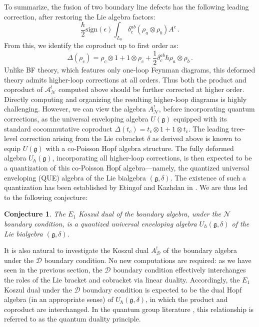 \documentclass[11pt]{article}
\numberwithin{equation}{section}
\newtheorem{conj}{Conjecture}[section]
\begin{document}
To summarize, the fusion of two boundary line defects has the following leading correction, after restoring the Lie algebra factors:
\begin{equation}
	\frac{\hbar}{2}\mathrm{sign}(\epsilon)\int_{L_0 }\delta^{ab}_c(\rho_a\otimes \rho_b)A^ c\,.
\end{equation}
From this, we identify the coproduct up to first order as:
\begin{equation}
	\Delta(\rho_c) = \rho_c\otimes 1 + 1\otimes \rho_c + \frac{1}{2}\delta^{ab}_c \hbar \rho_a\otimes \rho_b\,.
\end{equation}
Unlike BF theory, which features only one-loop Feynman diagrams, this deformed theory admits higher-loop corrections at all orders. Thus both the product and coproduct of $\mathcal{A}_{\mathcal{N}}^{!}$ computed above should be further corrected at higher order. Directly computing and organizing the resulting higher-loop diagrams is highly challenging. However, we can view the algebra $A^!_{\mathcal{N}}$, before incorporating quantum corrections, as the universal enveloping algebra $U(\mathfrak{g})$ equipped with its standard cocommutative coproduct $\Delta(t_c) = t_c \otimes 1 + 1 \otimes t_c$. The leading tree-level correction arising from the Lie cobracket $\delta$ as derived above is known to equip $U(\mathfrak{g})$ with a co-Poisson Hopf algebra structure. The fully deformed algebra $U_{\hbar}(\mathfrak{g})$, incorporating all higher-loop corrections, is then expected to be a quantization of this co-Poisson Hopf algebra—namely, the quantized universal enveloping (QUE) algebra of the Lie bialgebra $(\mathfrak{g},\delta)$. The existence of such a quantization has been established by Etingof and Kazhdan in \cite{EK1996QLBI,EK1998QLBII}. We are thus led to the following conjecture:
\begin{conj}
	The $E_1$ Koszul dual of the boundary algebra, under the $\mathcal{N}$ boundary condition, is a quantized universal enveloping algebra $U_{\hbar}(\mathfrak{g},\delta)$ of the Lie bialgebra $(\mathfrak{g},\delta)$.
\end{conj}

It is also natural to investigate the Koszul dual $A^!_\mathcal{D}$ of the boundary algebra under the $\mathcal{D}$ boundary condition. No new computations are required: as we have seen in the previous section, the $\mathcal{D}$ boundary condition effectively interchanges the roles of the Lie bracket and cobracket via linear duality. Accordingly, the $E_1$ Koszul dual under the $\mathcal{D}$ boundary condition is expected to be the dual Hopf algebra (in an appropriate sense) of $U_{\hbar}(\mathfrak{g},\delta)$, in which the product and coproduct are interchanged. In the quantum group literature \cite{Drinfeld1987QG,Gavarini2002QD}, this relationship is referred to as the quantum duality principle.
\end{document}
